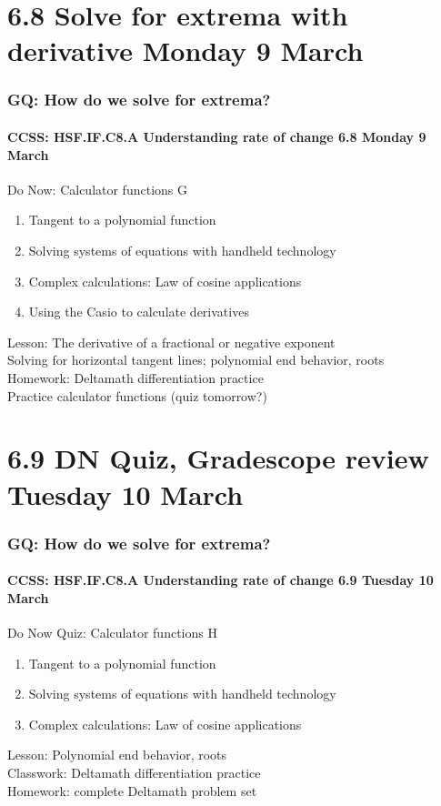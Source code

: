 \documentclass{beamer}
\begin{document}
\section{6.8 Solve for extrema with derivative \hfill Monday 9 March}
  \frame
  {
    \frametitle{GQ: How do we solve for extrema?}
    \framesubtitle{CCSS: HSF.IF.C8.A Understanding rate of change \hfill \alert{6.8 Monday 9 March}}
    \begin{block}{Do Now: Calculator functions G}
      \begin{enumerate}
        \item Tangent to a polynomial function
        \item Solving systems of equations with handheld technology
        \item Complex calculations: Law of cosine applications
        \item Using the Casio to calculate derivatives
      \end{enumerate}
      \end{block}
      Lesson: The derivative of a fractional or negative exponent \\ 
      Solving for horizontal tangent lines; polynomial end behavior, roots \\
      Homework: Deltamath differentiation practice \\ 
      Practice calculator functions (\alert{quiz tomorrow?})
      }

\section{6.9 DN Quiz, Gradescope review \hfill Tuesday 10 March}
  \frame
  {
    \frametitle{GQ: How do we solve for extrema?}
    \framesubtitle{CCSS: HSF.IF.C8.A Understanding rate of change \hfill \alert{6.9 Tuesday 10 March}}
    \begin{block}{Do Now Quiz: Calculator functions H}
      \begin{enumerate}
        \item Tangent to a polynomial function
        \item Solving systems of equations with handheld technology
        \item Complex calculations: Law of cosine applications
      \end{enumerate}
      \end{block}
      Lesson: Polynomial end behavior, roots \\
      Classwork: Deltamath differentiation practice \\ 
      Homework: complete Deltamath problem set
      }
\end{document}
